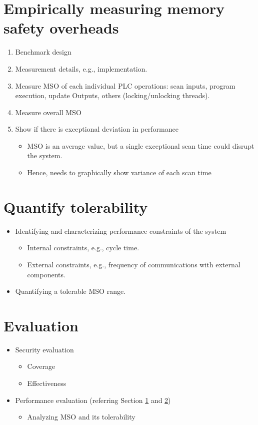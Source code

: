 \documentclass{acm_proc_article-sp}
\begin{document}
\section{Empirically measuring memory safety overheads}\label{sec:measuremso}
\begin{enumerate}
\item Benchmark design
\item Measurement details, e.g., implementation.
\item Measure MSO of each individual PLC operations: scan inputs, program execution, update Outputs, others (locking/unlocking threads). 
\item Measure overall MSO
\item Show if there is exceptional deviation in performance 
\begin{itemize}
\item MSO is an average value, but a single exceptional scan time could disrupt the system. 
\item Hence, needs to graphically show variance of each scan time
\end{itemize}
\end{enumerate}

\section{Quantify tolerability}\label{sec:tolerability}
\begin{itemize}
\item Identifying and characterizing performance constraints of the system
\begin{itemize}
\item Internal constraints, e.g., cycle time.
\item External constraints, e.g., frequency of communications with external components.
\end{itemize}
\item Quantifying a tolerable MSO range.
\end{itemize}

\section{Evaluation}
\begin{itemize}
\item Security evaluation
\begin{itemize}
\item Coverage
\item Effectiveness
\end{itemize}
\item Performance evaluation (referring Section \ref{sec:measuremso} and \ref{sec:tolerability})
\begin{itemize}
\item Analyzing MSO and its tolerability 
\end{itemize}
\end{itemize}
\end{document}
